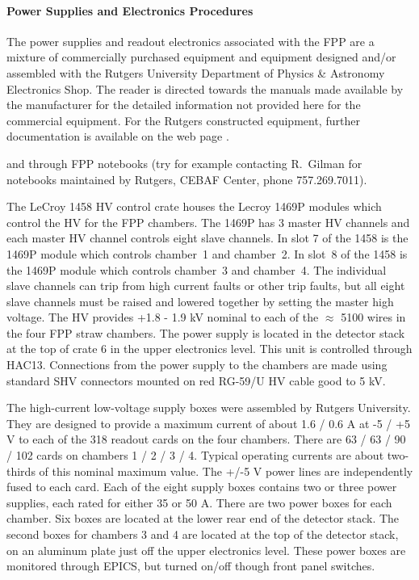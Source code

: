 \paragraph{Power Supplies and Electronics Procedures}

The power supplies and readout electronics associated with the FPP
are a mixture of commercially purchased equipment
and equipment designed and/or assembled with the Rutgers
University Department of Physics \& Astronomy Electronics Shop.
The reader is directed towards the manuals made available by the
manufacturer for the detailed information not provided here
for the commercial equipment.
For the Rutgers constructed equipment,
further documentation is available on the web page%
.

\noindent
and through FPP notebooks (try for example contacting R.\ Gilman 
for notebooks maintained by Rutgers, CEBAF Center, phone 757.269.7011).

The LeCroy 1458 HV control crate houses the Lecroy  1469P modules
which control the HV for the FPP chambers. The 1469P has 3 master HV
channels and each master HV channel controls eight slave channels.
In slot 7 of the 1458 is the 1469P module 
which controls chamber~1 and chamber~2.
In slot~8 of the 1458 is the 1469P module 
which controls chamber~3 and chamber~4.
The individual slave channels can trip from high current faults
or other trip faults, but all eight slave channels must be raised and lowered
together by setting the master high voltage.
The HV provides +1.8 - 1.9 kV nominal to
each of the $\approx$ 5100 wires in the four FPP straw chambers.
The power supply is located in the detector stack at the top of
crate 6 in the upper electronics level.
This unit is controlled through HAC13.
Connections from the power supply to the chambers are made using
standard SHV connectors mounted on red RG-59/U HV cable good to 5 kV.

The high-current low-voltage supply boxes were assembled by Rutgers
University.
They are designed to provide a maximum current of about 1.6 / 0.6 A
at -5 / +5 V to each of the 318 readout cards on the four chambers.
There are 63 / 63 / 90 / 102 cards on chambers 1 / 2 / 3 / 4.
Typical operating currents are about two-thirds of this nominal
maximum value.
The +/-5 V power lines are independently fused to each card.
Each of the eight supply boxes contains two or three power supplies,
each rated for either 35 or 50 A.
There are two power boxes for each chamber.
Six boxes are located at the lower rear end of the detector stack.
The second boxes for chambers 3 and 4 are located at the top of the
detector stack, on an aluminum plate just off the upper electronics level.
These power boxes are monitored through EPICS, but turned on/off
though front panel switches.

